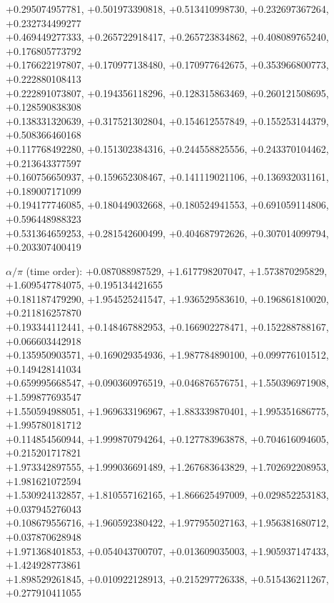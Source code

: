\begin{flushleft}
+0.295074957781, +0.501973390818, +0.513410998730, +0.232697367264, +0.232734499277 \\
+0.469449277333, +0.265722918417, +0.265723834862, +0.408089765240, +0.176805773792 \\
+0.176622197807, +0.170977138480, +0.170977642675, +0.353966800773, +0.222880108413 \\
+0.222891073807, +0.194356118296, +0.128315863469, +0.260121508695, +0.128590838308 \\
+0.138331320639, +0.317521302804, +0.154612557849, +0.155253144379, +0.508366460168 \\
+0.117768492280, +0.151302384316, +0.244558825556, +0.243370104462, +0.213643377597 \\
+0.160756650937, +0.159652308467, +0.141119021106, +0.136932031161, +0.189007171099 \\
+0.194177746085, +0.180449032668, +0.180524941553, +0.691059114806, +0.596448988323 \\
+0.531364659253, +0.281542600499, +0.404687972626, +0.307014099794, +0.203307400419
\par\noindent$\alpha/\pi$ (time order):
+0.087088987529, +1.617798207047, +1.573870295829, +1.609547784075, +0.195134421655 \\
+0.181187479290, +1.954525241547, +1.936529583610, +0.196861810020, +0.211816257870 \\
+0.193344112441, +0.148467882953, +0.166902278471, +0.152288788167, +0.066603442918 \\
+0.135950903571, +0.169029354936, +1.987784890100, +0.099776101512, +0.149428141034 \\
+0.659995668547, +0.090360976519, +0.046876576751, +1.550396971908, +1.599877693547 \\
+1.550594988051, +1.969633196967, +1.883339870401, +1.995351686775, +1.995780181712 \\
+0.114854560944, +1.999870794264, +0.127783963878, +0.704616094605, +0.215201717821 \\
+1.973342897555, +1.999036691489, +1.267683643829, +1.702692208953, +1.981621072594 \\
+1.530924132857, +1.810557162165, +1.866625497009, +0.029852253183, +0.037945276043 \\
+0.108679556716, +1.960592380422, +1.977955027163, +1.956381680712, +0.037870628948 \\
+1.971368401853, +0.054043700707, +0.013609035003, +1.905937147433, +1.424928773861 \\
+1.898529261845, +0.010922128913, +0.215297726338, +0.515436211267, +0.277910411055 \\

\end{flushleft}
